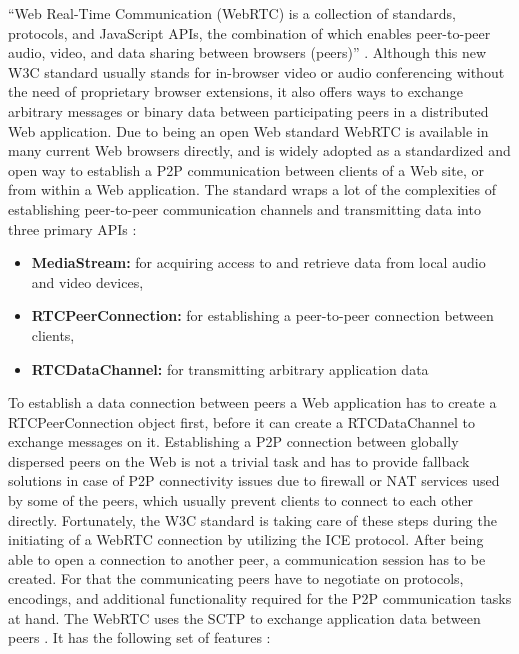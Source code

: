 ``Web Real-Time Communication (\gls{WebRTC}) is a collection of standards, protocols, and JavaScript \gls{API}s, the combination of which enables peer-to-peer audio, video, and data sharing between browsers (peers)'' \citep[pg. 307]{grigorik2013high}. Although this new \gls{W3C} standard usually stands for in-browser video or audio conferencing without the need of proprietary browser extensions, it also offers ways to exchange arbitrary messages or binary data between participating peers in a distributed Web application. Due to being an open Web standard \gls{WebRTC} is available in many current Web browsers directly, and is widely adopted as a standardized and open way to establish a \gls{P2P} communication between clients of a Web site, or from within a Web application. The standard wraps a lot of the complexities of establishing peer-to-peer communication channels and transmitting data into three primary \gls{API}s \citep[pg. 307-308]{grigorik2013high}: \@

\begin{itemize}
	\item \textbf{MediaStream:} for acquiring access to and retrieve data from local audio and video devices,
	\item \textbf{RTCPeerConnection:} for establishing a peer-to-peer connection between clients,
	\item \textbf{RTCDataChannel:} for transmitting arbitrary application data
\end{itemize}

To establish a data connection between peers a Web application has to create a RTCPeerConnection object first, before it can create a RTCDataChannel to exchange messages on it. Establishing a \gls{P2P} connection between globally dispersed peers on the Web is not a trivial task and has to provide fallback solutions in case of \gls{P2P} connectivity issues due to firewall or \gls{NAT} services used by some of the peers, which usually prevent clients to connect to each other directly. Fortunately, the \gls{W3C} standard is taking care of these steps during the initiating of a \gls{WebRTC} connection by utilizing the \gls{ICE} protocol. After being able to open a connection to another peer, a communication session has to be created. For that the communicating peers have to negotiate on protocols, encodings, and additional functionality required for the \gls{P2P} communication tasks at hand. The \gls{WebRTC} uses the \gls{SCTP} to exchange application data between peers \citep[pg. 315-330]{grigorik2013high}. It has the following set of features \citep[pg. 342]{grigorik2013high}: \@

